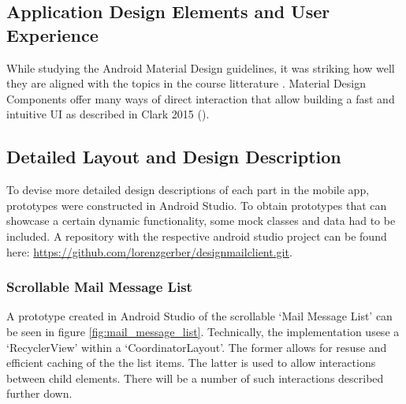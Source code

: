 \documentclass[a4paper,11pt,twoside]{article}
\begin{document}
\subsection{Application Design Elements and User Experience}
While studying the Android Material Design guidelines, it was striking how well
they are aligned with the topics in the course litterature \cite{clark2015}.
Material Design Components offer many ways of direct interaction that allow
building a fast and intuitive UI as described in Clark 2015 (\cite[chapter 3,
'Enable primary tasks directly from list view']{clark2015}).


\subsection{Detailed Layout and Design Description}
To devise more detailed design descriptions of each part in the mobile app,
prototypes were constructed in Android Studio. To obtain prototypes that
can showcase a certain dynamic functionality, some mock classes and data had to be
included. A repository with the respective android studio project can be found
here: \url{https://github.com/lorenzgerber/designmailclient.git}.

\subsubsection{Scrollable Mail Message List}
A prototype created in Android Studio of the scrollable `Mail Message List' can be
seen in figure \ref{fig:mail_message_list}. Technically, the implementation
usese a `RecyclerView' within a `CoordinatorLayout'. The former allows for
resuse and efficient caching of the the list items. The latter is used to allow
interactions between child elements. There will be a number of such interactions
described further down.
\end{document}
